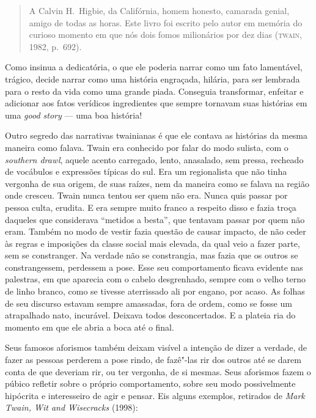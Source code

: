 \begin{quote}
A Calvin H.~Higbie, da Califórnia, homem honesto, camarada genial, amigo de todas as
horas. Este livro foi escrito pelo autor em memória do curioso momento em que
nós dois fomos milionários por dez dias (\textsc{twain}, 1982, p.~692).
\end{quote}

Como insinua a dedicatória, o que ele poderia narrar como um fato
lamentável, trágico, decide narrar como uma história engraçada, hilária,
para ser lembrada para o resto da vida como uma grande piada. Conseguia
transformar, enfeitar e adicionar aos fatos verídicos ingredientes que
sempre tornavam suas histórias em uma \textit{good story} --- uma boa história!

Outro segredo das narrativas twainianas é que ele contava as histórias da
mesma maneira como falava. Twain era conhecido por falar do modo sulista,
com o \textit{southern drawl}, aquele acento carregado, lento, anasalado, sem
pressa, recheado de vocábulos e expressões típicas do sul. Era um
regionalista que não tinha vergonha de sua origem, de suas raízes, nem da
maneira como se falava na região onde cresceu. Twain nunca tentou ser quem não era. Nunca quis passar por pessoa culta,
erudita. E era sempre muito franco a respeito disso e fazia troça daqueles
que considerava ``metidos a besta'', que tentavam passar
por quem não eram. Também no modo de vestir fazia questão de causar
impacto, de não ceder às regras e imposições da classe social mais
elevada, da qual veio a fazer parte, sem se constranger. Na verdade não se
constrangia, mas fazia que os outros se constrangessem, perdessem a
pose. Esse seu comportamento ficava evidente nas palestras, em que
aparecia com o cabelo desgrenhado, sempre com o velho terno de linho
branco, como se tivesse aterrissado ali por engano, por acaso. As folhas
de seu discurso estavam sempre amassadas, fora de ordem, como se fosse um
atrapalhado nato, incurável. Deixava todos desconcertados. E a plateia ria do momento em que ele abria a boca até o final.

Seus famosos aforismos também deixam visível a intenção de dizer a
verdade, de fazer as pessoas perderem a pose rindo, de fazê"-las rir dos
outros até se darem conta de que deveriam rir, ou ter vergonha, de si mesmas.
Seus aforismos fazem o púbico refletir sobre o próprio comportamento,
sobre seu modo possivelmente hipócrita e interesseiro de agir e pensar. Eis
alguns exemplos, retirados de \textit{Mark Twain, Wit and Wisecracks} (1998): 

